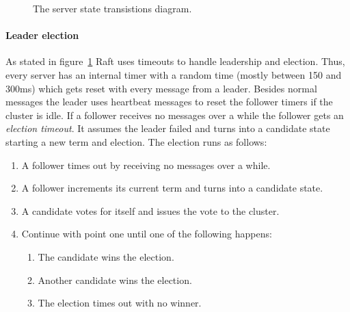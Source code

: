 \begin{figure}[ht]
  \centering
  \caption{The server state transistions diagram.~\cite{ongaro2014search}}
  \label{fig:serverstates}
\end{figure}

\paragraph{Leader election}
As stated in figure~\ref{fig:serverstates} Raft uses timeouts to handle
leadership and election. Thus, every server has an internal timer with a
random time (mostly between 150 and 300ms) which gets reset with
every message from a leader. Besides normal messages the leader uses
heartbeat messages to reset the follower timers if the cluster is idle.
If a follower receives no messages over a while the
follower gets an \textit{election timeout}. It assumes the leader
failed and turns into a candidate state starting a new term and
election. The election runs as follows:~\cite{ongaro2014search}

\begin{enumerate}
\item A follower times out by receiving no messages over a while.
\item A follower increments its current term and turns into a candidate state.
\item A candidate votes for itself and issues the vote to the cluster.
\item Continue with point one until one of the following happens:
  \begin{enumerate}
  \item The candidate wins the election.
  \item Another candidate wins the election.
  \item The election times out with no winner.
  \end{enumerate}
\end{enumerate}

